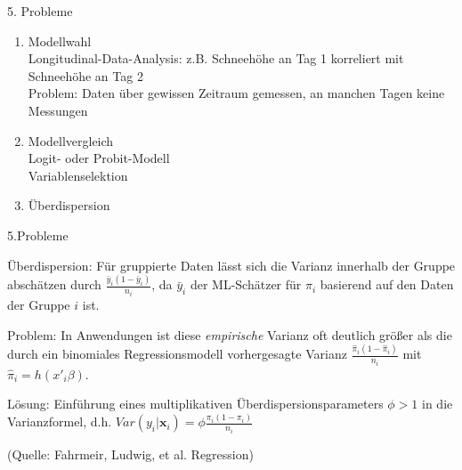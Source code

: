 \documentclass{beamer}
\begin{document}
\begin{frame}[t]{5. Probleme}\vspace{4pt}
\begin{enumerate}
    \item Modellwahl\\
     Longitudinal-Data-Analysis: z.B. Schneehöhe an Tag 1 korreliert mit Schneehöhe an Tag 2 \\
     Problem: Daten über gewissen Zeitraum gemessen, an manchen Tagen keine Messungen
    \item Modellvergleich\\
     Logit- oder Probit-Modell \\
     Variablenselektion
    \item Überdispersion
\end{enumerate}
\end{frame}

\begin{frame}[t]{5.Probleme}\vspace{4pt}
\begin{block}{Überdispersion:}
Für gruppierte Daten lässt sich die Varianz innerhalb der Gruppe abschätzen durch $\frac{\bar y_{i}(1- \bar y_{i})}{n_{i}}$, da $\bar y_{i}$ der ML-Schätzer für $\pi_{i}$ basierend auf den Daten der Gruppe $i$ ist.
\end{block}
\begin{block}{Problem:}
In Anwendungen ist diese \textit{empirische} Varianz oft deutlich größer als die durch ein binomiales Regressionsmodell vorhergesagte Varianz $\frac{\hat{\pi}_{i}(1- \hat{\pi}_{i})}{n_{i}}$ mit $\hat{\pi}_{i}=h(x'_{i}\beta)$. \\
\end{block}

\begin{block}{Lösung:}
Einführung eines multiplikativen Überdispersionsparameters $\phi > 1$ in die Varianzformel, d.h. $Var(y_{i}|\textbf{x}_{i})=\phi \frac{\pi_{i}(1-\pi_{i})}{n_{i}}$

\end{block}

\tiny{(Quelle: Fahrmeir, Ludwig, et al. Regression)}
\end{frame}
\end{document}
